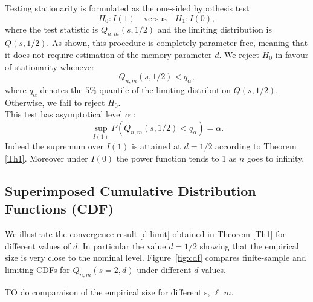 \documentclass[12pt]{article}
\begin{document}
Testing stationarity is formulated as the one-sided hypothesis  test
\[
H_0: I(1) \quad \text{versus} \quad H_1: I(0),
\]
where the test statistic is $Q_{n,m}(s,1/2)$ and the limiting distribution is $Q(s,1/2)$.  As shown, this procedure is completely parameter free, meaning that it does not require estimation of the memory parameter $d$. We reject $H_0$ in favour of stationarity whenever  
\[
Q_{n,m}(s,1/2) < q_{\alpha},
\]
where $q_{\alpha}$ denotes the $5\%$ quantile of the limiting distribution $Q(s,1/2)$. Otherwise, we fail to reject $H_0$.\\

This test has asymptotical level $\alpha$ : 
$$ \sup_{I(1)} P(Q_{n,m}(s,1/2) < q_{\alpha})  =  \alpha.$$ 
Indeed the supremum over $I(1)$ is attained  at $d=1/2$ according to Theorem \ref{Th1}. 
Moreover under $I(0)$ the power function tends to 1 as $n$ goes to infinity. 

\subsection{Superimposed Cumulative Distribution Functions (CDF)}
We illustrate the convergence result \eqref{d limit} obtained in Theorem \ref{Th1} for different values of $d$. In particular the value $d=1/2$ showing that the empirical size is very close to the nominal level. 
Figure~\ref{fig:cdf} compares finite-sample and limiting CDFs
for $Q_{n,m}(s=2,d)$ under different $d$ values.

\iffalse
TO do comparaison of the empirical size for different s, $\ell$ $m$. 
\end{document}
